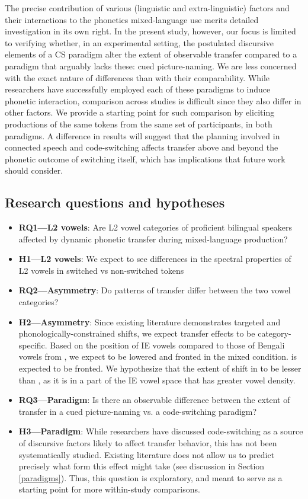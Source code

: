 \documentclass[12 pt]{article}
\newcommand{\nt}[1]{\textipa{[#1]}} %
\begin{document}
The precise contribution of various (linguistic and extra-linguistic) factors and their interactions to the phonetics mixed-language use merits detailed investigation in its own right. In the present study, however, our focus is limited to verifying whether, in an experimental setting, the postulated discursive elements of a CS paradigm alter the extent of observable transfer compared to a paradigm that arguably lacks these: cued picture-naming. We are less concerned with the exact nature of differences than with their comparability. While researchers have successfully employed each of these paradigms to induce phonetic interaction, comparison across studies is difficult since they also differ in other factors. We provide a starting point for such comparison by eliciting productions of the same tokens from the same set of participants, in both paradigms. A difference in results will suggest that the planning involved in connected speech and code-switching affects transfer above and beyond the phonetic outcome of switching itself, which has implications that future work should consider. 


\subsection*{Research questions and hypotheses}\label{questions_and_hypotheses}
\begin{itemize}
	\item \textbf{RQ1---L2 vowels}: Are L2 vowel categories of proficient bilingual speakers affected by dynamic phonetic transfer during mixed-language production?
	\item \textbf{H1---L2 vowels}: We expect to see differences in the spectral properties of L2 vowels in switched vs non-switched tokens
	\item \textbf{RQ2---Asymmetry}: Do patterns of transfer differ between the two vowel categories?
	\item \textbf{H2---Asymmetry}: Since existing literature demonstrates targeted and phonologically-constrained shifts, we expect transfer effects to be category-specific. Based on the position of IE vowels compared to those of Bengali vowels from \cite{shruticorpus}, we expect \nt{2} to be lowered and fronted in the mixed condition. \nt{\ae} is expected to be fronted. We hypothesize that the extent of shift in \nt{\ae} to be lesser than \nt{2}, as it is in a part of the IE vowel space that has greater vowel density.
	\item \textbf{RQ3---Paradigm}: Is there an observable difference between the extent of transfer in a cued picture-naming vs. a code-switching paradigm? 
	\item \textbf{H3---Paradigm}: While researchers have discussed code-switching as a source of discursive factors likely to affect transfer behavior, this has not been systematically studied. Existing literature does not allow us to predict precisely what form this effect might take (see discussion in Section \ref{paradigms}). Thus, this question is exploratory, and meant to serve as a starting point for more within-study comparisons. 
\end{itemize}
\end{document}
